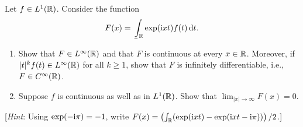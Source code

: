 \begin{problem}
  Let $f\in L^1(\mathbb{R})$. Consider the function
  \[
    F(x)=\lowint_{\bbR} \exp(\rmi xt) f(t)\diff t.
  \]
  \begin{enumerate}[label=(\roman*),noitemsep]
  \item Show that $F\in L^\infty(\mathbb{R})$ and that $F$ is continuous at every
    $x\in\mathbb{R}$. Moreover, if $|t|^kf(t)\in L^\infty(\mathbb{R})$ for all $k\geq
    1$, show that $F$ is infinitely differentiable, i.e., $F\in
    C^\infty(\mathbb{R})$.
  \item Suppose $f$ is continuous as well as in $L^1(\mathbb{R})$. Show that
    $\lim_{|x|\to\infty} F(x)=0$.
  \end{enumerate}
  [\emph{Hint}: Using $\exp(-\mathrm{i}\pi)=-1$, write
  $F(x)=\left(\int_{\mathbb{R}}(\exp(\mathrm{i} xt)-\exp(\mathrm{i} xt-\mathrm{i}\pi))\right)/2$.]
\end{problem}
\begin{solution}
\end{solution}

